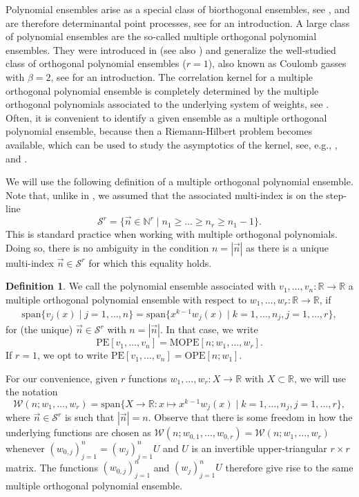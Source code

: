 \documentclass[a4paper,12pt,oneside]{article}
\theoremstyle{definition}
\newtheorem{defi}{Definition}[section]
\newcommand{\N}{\mathbb{N}}
\newcommand{\R}{\mathbb{R}}
\newcommand{\sz}[1]{\left| \vec{#1} \right|}
\newcommand{\spn}[1]{\text{span}\{#1\}}
\begin{document}
Polynomial ensembles arise as a special class of biorthogonal ensembles, see \cite{B:BE,KS:gin_prod}, and are therefore determinantal point processes, see \cite{J:DPP} for an introduction. A large class of polynomial ensembles are the so-called multiple orthogonal polynomial ensembles. They were introduced in \cite{Kuijlaars:MOPE} (see also \cite{AK:MOPE}) and generalize the well-studied class of orthogonal polynomial ensembles ($r=1$), also known as Coulomb gasses with $\beta=2$, see \cite{D:OPE} for an introduction. The correlation kernel for a multiple orthogonal polynomial ensemble is completely determined by the multiple orthogonal polynomials associated to the underlying system of weights, see \cite{Daems-Kuijlaars:CD_MOP}. Often, it is convenient to identify a given ensemble as a multiple orthogonal polynomial ensemble, because then a Riemann-Hilbert problem becomes available, which can be used to study the asymptotics of the kernel, see, e.g., \cite{BK:ext_src,BK:ext_src_1,ABK:ext_src_2,BK:ext_src_3}, \cite{KMFW:Bessel,KMFW:Bessel_1} and \cite{LY:ins_II,LY:ins_II_asym}.
\medbreak

We will use the following definition of a multiple orthogonal polynomial ensemble. Note that, unlike in \cite{Kuijlaars:MOPE}, we assumed that the associated multi-index is on the step-line 
$$\mathcal{S}^r = \{\vec{n}\in\N^r \mid n_1\geq\dots\geq n_r\geq n_1-1 \}.$$ 
This is standard practice when working with multiple orthogonal polynomials. Doing so, there is no ambiguity in the condition $n=\sz{n}$ as there is a unique multi-index $\vec{n}\in\mathcal{S}^r$ for which this equality holds.

\begin{defi} \label{def_MOPE_}
    We call the polynomial ensemble associated with $v_1,\dots,v_n:\R\to\R$ a multiple orthogonal polynomial ensemble with respect to $w_1,\dots,w_r:\R\to\R$, if
    \begin{align*}
        \spn{v_j(x) \mid j=1,\dots,n} = \spn{x^{k-1} w_j(x) \mid k=1,\dots,n_j, j=1,\dots,r},
    \end{align*}
for (the unique) $\vec{n}\in\mathcal{S}^r$ with $n=\sz{n}$. In that case, we write 
$$\text{PE}[v_1,\dots,v_n] = \text{MOPE}[n;w_1,\dots,w_r].$$
If $r=1$, we opt to write $\text{PE}[v_1,\dots,v_n] = \text{OPE}[n;w_1]$.
\end{defi}

For our convenience, given $r$ functions $w_1,\dots,w_r:X\to\R$ with $X\subset\R$, we will use the notation
    $$\mathcal{W}(n;w_1,\dots,w_r)=\spn{X\to\R:x\mapsto x^{k-1} w_j(x) \mid k=1,\dots,n_j, j=1,\dots,r},$$
where $\vec{n}\in\mathcal{S}^r$ is such that $\sz{n}=n$. Observe that there is some freedom in how the underlying functions are chosen as $\mathcal{W}(n;w_{0,1},\dots,w_{0,r})=\mathcal{W}(n;w_1,\dots,w_r)$ whenever $(w_{0,j})_{j=1}^n = (w_j)_{j=1}^n U$ and $U$ is an invertible upper-triangular $r\times r$ matrix. The functions $(w_{0,j})_{j=1}^n$ and $(w_j)_{j=1}^n U$ therefore give rise to the same multiple orthogonal polynomial ensemble.
\medbreak
\end{document}
